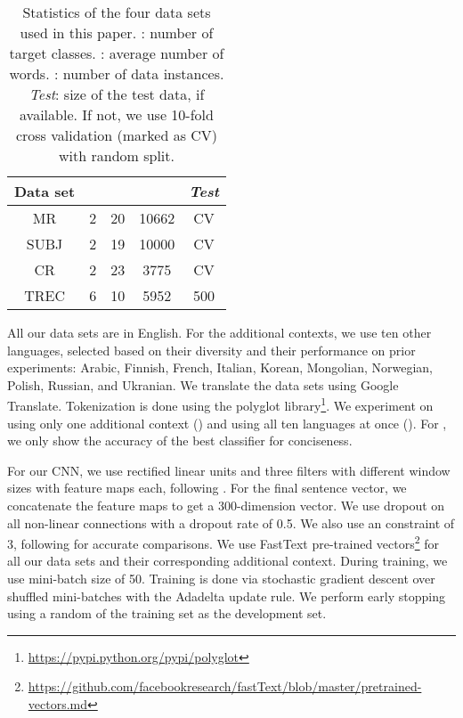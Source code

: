 \documentclass{article}
\begin{document}
\begin{table}[!t]
	\scriptsize
  \centering
    \begin{tabular}{|c|c|c|c|c|}
    \hline
    \textbf{Data set} &  &  &   & \textit{Test} \\
    \hline
    MR    & 2     & 20    & 10662 & CV \\
    SUBJ  & 2     & 19    & 10000 & CV \\
    CR    & 2     & 23    & 3775  & CV \\
    TREC  & 6     & 10    & 5952  & 500 \\
    \hline
    \end{tabular}\caption{Statistics of the four data sets used in this paper. : number of target classes. : average number of words. : number of data instances. \textit{Test}: size of the test data, if available. If not, we use 10-fold cross validation (marked as CV) with random split.}
  \label{tab:data}\end{table}

All our data sets are in English. For the additional contexts, we use ten other languages, selected based on their diversity and their performance on prior experiments: Arabic, Finnish, French, Italian, Korean, Mongolian, Norwegian, Polish, Russian, and Ukranian. We translate the data sets using Google Translate. Tokenization is done using the polyglot library\footnote{\url{https://pypi.python.org/pypi/polyglot}}. We experiment on using only one additional context () and using all ten languages at once (). For , we only show the accuracy of the best classifier for conciseness.

For our CNN, we use rectified linear units and three filters with different window sizes  with  feature maps each, following \cite{Kim2014ConvolutionalNN}. For the final sentence vector, we concatenate the feature maps to get a 300-dimension vector. We use dropout \cite{srivastava2014dropout} on all non-linear connections with a dropout rate of 0.5. We also use an  constraint of 3, following
\cite{Kim2014ConvolutionalNN} for accurate comparisons. We use FastText pre-trained vectors\footnote{\url{https://github.com/facebookresearch/fastText/blob/master/pretrained-vectors.md}} \cite{bojanowski2016enriching} for all our data sets and their corresponding additional context.
During training, we use mini-batch size of 50. Training is done via stochastic gradient descent over shuffled mini-batches with the Adadelta update rule. We perform early stopping using a random  of the training set as the development set.
\end{document}
